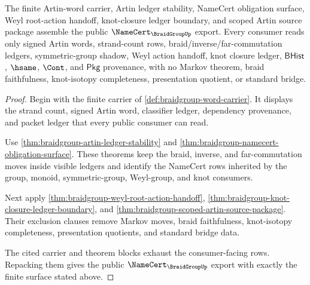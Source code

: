 \begin{theorem}
\label{thm:braidgroup-public-namecert-export}
The finite Artin-word carrier, Artin ledger stability, NameCert obligation
surface, Weyl root-action handoff, knot-closure ledger boundary, and scoped
Artin source package assemble the public $\NameCert_{\BraidGroupUp}$ export.
Every consumer reads only signed Artin words, strand-count rows,
braid/inverse/far-commutation ledgers, symmetric-group shadow, Weyl action
handoff, knot closure ledger, $\mathsf{BHist}$, $\hsame$, $\Cont$, and
$\mathsf{Pkg}$ provenance, with no Markov theorem, braid faithfulness,
knot-isotopy completeness, presentation quotient, or standard bridge.
\end{theorem}
\begin{proof}
Begin with the finite carrier of \autoref{def:braidgroup-word-carrier}. It
displays the strand count, signed Artin word, classifier ledger, dependency
provenance, and packet ledger that every public consumer can read.

Use \autoref{thm:braidgroup-artin-ledger-stability} and
\autoref{thm:braidgroup-namecert-obligation-surface}. These theorems keep the
braid, inverse, and far-commutation moves inside visible ledgers and identify
the NameCert rows inherited by the group, monoid, symmetric-group, Weyl-group,
and knot consumers.

Next apply \autoref{thm:braidgroup-weyl-root-action-handoff},
\autoref{thm:braidgroup-knot-closure-ledger-boundary}, and
\autoref{thm:braidgroup-scoped-artin-source-package}. Their exclusion clauses
remove Markov moves, braid faithfulness, knot-isotopy completeness,
presentation quotients, and standard bridge data.

The cited carrier and theorem blocks exhaust the consumer-facing rows. Repacking
them gives the public $\NameCert_{\BraidGroupUp}$ export with exactly the finite
surface stated above.
\end{proof}

